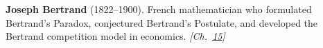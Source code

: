 \textbf{Joseph Bertrand} (1822–1900). French mathematician who formulated Bertrand's Paradox, conjectured Bertrand's Postulate, and developed the Bertrand competition model in economics. \emph{[Ch.~\hyperref[ch:envelopeparadox]{15}]}

